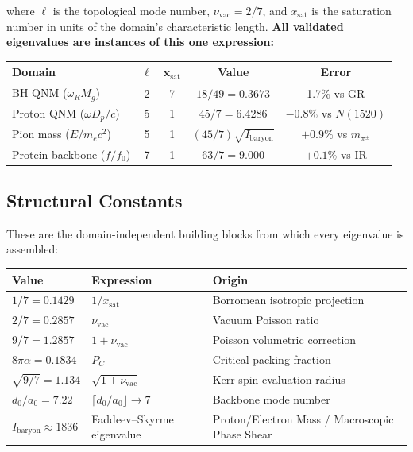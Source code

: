 \noindent where $\ell$ is the topological mode number, $\nu_\mathrm{vac} = 2/7$, and $x_\mathrm{sat}$ is the saturation number in units of the domain's characteristic length.  \textbf{All validated eigenvalues are instances of this one expression:}

\begin{center}
\renewcommand{\arraystretch}{1.3}
\begin{tabular}{l c c c c}
\toprule
\textbf{Domain} & $\bm{\ell}$ & $\bm{x_\mathrm{sat}}$ & \textbf{Value} & \textbf{Error} \\
\midrule
BH QNM ($\omega_R M_g$) & 2 & 7 & $18/49 = 0.3673$ & 1.7\% vs GR \\
Proton QNM ($\omega D_p/c$) & 5 & 1 & $45/7 = 6.4286$ & $-0.8\%$ vs $N(1520)$ \\
Pion mass ($E/m_e c^2$) & 5 & 1 & $(45/7)\sqrt{I_\mathrm{baryon}}$ & $+0.9\%$ vs $m_{\pi^\pm}$ \\
Protein backbone ($f/f_0$) & 7 & 1 & $63/7 = 9.000$ & $+0.1\%$ vs IR \\
\bottomrule
\end{tabular}
\end{center}

\subsection{Structural Constants}

These are the domain-independent building blocks from which every eigenvalue is assembled:

\begin{center}
\renewcommand{\arraystretch}{1.3}
\begin{tabularx}{\textwidth}{@{}l l X@{}}
\toprule
\textbf{Value} & \textbf{Expression} & \textbf{Origin} \\
\midrule
$1/7 = 0.1429$ & $1/x_\mathrm{sat}$ & Borromean isotropic projection \\
$2/7 = 0.2857$ & $\nu_\mathrm{vac}$ & Vacuum Poisson ratio \\
$9/7 = 1.2857$ & $1 + \nu_\mathrm{vac}$ & Poisson volumetric correction \\
$8\pi\alpha = 0.1834$ & $P_C$ & Critical packing fraction \\
$\sqrt{9/7} = 1.134$ & $\sqrt{1+\nu_\mathrm{vac}}$ & Kerr spin evaluation radius \\
$d_0/a_0 = 7.22$ & $\lceil d_0/a_0 \rfloor \to 7$ & Backbone mode number \\
$I_\mathrm{baryon} \approx 1836$ & Faddeev--Skyrme eigenvalue & Proton/Electron Mass / Macroscopic Phase Shear \\
\bottomrule
\end{tabularx}
\end{center}

